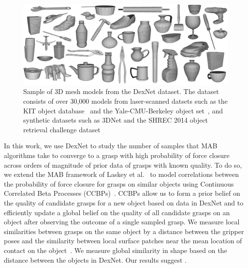 \begin{figure}[t!]
\centering
\includegraphics[scale=0.085]{figures/dexnet_collage.jpg}
\caption{Sample of 3D mesh models from the DexNet dataset. The dataset consists of over 30,000 models from laser-scanned datsets such as the KIT object database~\cite{kasper2012kit} and the Yale-CMU-Berkeley object set~\cite{calli2015benchmarking}, and synthetic datasets such as 3DNet\cite{wohlkinger20123dnet} and the SHREC 2014 object retrieval challenge dataset~\cite{li2015comparison} }
\vspace*{-15pt}
\end{figure}

In this work, we use DexNet to study the number of samples that MAB algorithms take to converge to a grasp with high probability of force closure across orders of magnitude of prior data of grasps with known quality.
To do so, we extend the MAB framework of Laskey et al.~\cite{laskey2015bandits} to model correlations between the probability of force closure for grasps on similar objects using Continuous Correlated Beta Processes (CCBPs)~\cite{goetschalckx2011continuous, montesano2012active}.
CCBPs allow us to form a prior belief on the quality of candidate grasps for a new object based on data in DexNet and to efficiently update a global belief on the quality of all candidate grasps on an object after observing the outcome of a single sampled grasp.
We measure local similarities between grasps on the same object by a distance between the gripper poses and the similarity between local surface patches near the mean location of contact on the object~\cite{herzog2014learning, kappler2015leveraging}.
We measure global similarity in shape based on the distance between the objects in DexNet.
Our results suggest .


 





